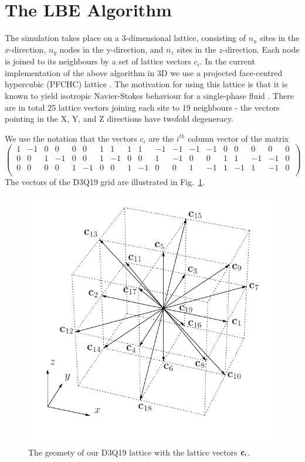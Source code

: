 \documentclass[a4paper]{article}
\begin{document}

\clearpage

\section{The LBE Algorithm}

The simulation takes place on a 3-dimensional lattice, consisting of
$n_x$ sites in the $x$-direction, $n_y$ nodes in the y-direction, and
$n_z$ sites in the $z$-direction. Each node is joined to its neighbours by
a set of lattice vectors $c_i$.
In the current implementation of the above algorithm in 3D we use 
a projected face-centred hypercubic (PFCHC) lattice \cite{bib:pfchc}.
The motivation for using this lattice is that it is known to yield 
isotropic Navier-Stokes behaviour for a single-phase fluid \cite{bib:pfchc}. 
There are in total 25 lattice vectors
joining each site to 19 neighbours - the vectors pointing in the X, Y,
and Z directions have twofold degeneracy. 

We use the notation that the vectors $c_i$ are the $i^{th}$ column 
vector of the matrix
\[
  \left(\,
  \begin{array}{ccccccccccccccccccc}
    1 & -1 & 0 &  0 & 0 &  0 & 1 &  1 & 1 &  1 & -1 & -1 & -1 & -1 & 0 &  0 &  0 &  0 & 0 \\    
    0 &  0 & 1 & -1 & 0 &  0 & 1 & -1 & 0 &  0 &  1 & -1 &  0 &  0 & 1 &  1 & -1 & -1 & 0 \\
    0 &  0 & 0 &  0 & 1 & -1 & 0 &  0 & 1 & -1 &  0 &  0 &  1 & -1 & 1 & -1 &  1 & -1 & 0 \\
  \end{array}\,
  \right)
\]
The vectors of the D3Q19 grid are illustrated in Fig.~\ref{fig_d3q19}.
\begin{figure}
\centering  \includegraphics[width=0.6\linewidth]{d3q19.pdf}

\caption{The geomety of our D3Q19 lattice with the lattice vectors $ {\bf c }_i$.
  \label{fig_d3q19}
}
\end{figure}
\end{document}
